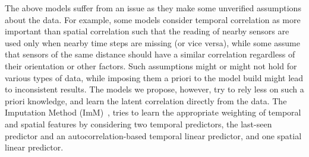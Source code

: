 The above models suffer from an issue as they make some unverified assumptions about the data. For example, some models consider temporal correlation as more important than spatial correlation such that the reading of nearby sensors are used only when nearby time steps are missing (or vice versa), while some assume that sensors of the same distance should have a similar correlation regardless of their 
orientation or other factors.  Such assumptions might or might not hold for various types of data, while imposing them a priori
to the model build might lead to inconsistent results.  The models we propose, however, try to rely less on such a priori 
knowledge, and learn the latent correlation directly from the data.  The Imputation Method (ImM)~\cite{Lim:robust}, tries to learn
the appropriate weighting of temporal and spatial features by considering two temporal predictors, the last-seen predictor
and an autocorrelation-based temporal linear predictor, and one spatial linear predictor.


